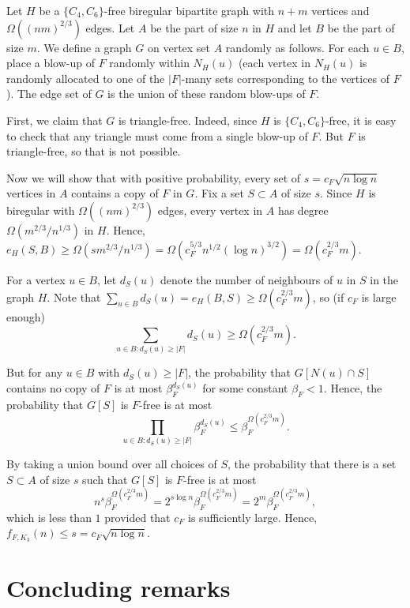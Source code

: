 \documentclass[11pt]{article}
\let\oldendproof\endproof
\renewenvironment{proof}[1][\proofname]{\oldproof[\bf #1]}{\oldendproof}
\theoremstyle{plain}
\theoremstyle{definition}
\begin{document}
\begin{proof}
	Let $H$ be a $\{C_4,C_6\}$-free biregular bipartite graph with $n+m$ vertices and $\Omega((nm)^{2/3})$ edges. Let $A$ be the part of size $n$ in $H$ and let $B$ be the part of size $m$. We define a graph $G$ on vertex set $A$ randomly as follows. For each $u\in B$, place a blow-up of $F$ randomly within $N_H(u)$ (each vertex in $N_H(u)$ is randomly allocated to one of the $|F|$-many sets corresponding to the vertices of $F$). The edge set of $G$ is the union of these random blow-ups of $F$.
	
	First, we claim that $G$ is triangle-free. Indeed, since $H$ is $\{C_4,C_6\}$-free, it is easy to check that any triangle must come from a single blow-up of $F$. But $F$ is triangle-free, so that is not possible.
	
	Now we will show that with positive probability, every set of $s=c_F\sqrt{n \log n}$ vertices in $A$ contains a copy of $F$ in $G$. Fix a set $S\subset A$ of size $s$. Since $H$ is biregular with $\Omega((nm)^{2/3})$ edges, every vertex in $A$ has degree $\Omega(m^{2/3}/n^{1/3})$ in $H$. Hence, $e_H(S,B)\geq \Omega(sm^{2/3}/n^{1/3})=\Omega(c_F^{5/3} n^{1/2} (\log n)^{3/2})=\Omega(c_F^{2/3} m)$.
	
	For a vertex $u\in B$, let $d_S(u)$ denote the number of neighbours of $u$ in $S$ in the graph $H$. Note that $\sum_{u\in B} d_S(u)=e_H(B,S)\geq \Omega(c_F^{2/3} m)$, so (if $c_F$ is large enough)
	$$\sum_{u\in B: d_S(u)\geq |F|} d_S(u)\geq \Omega(c_F^{2/3} m).$$
	
	But for any $u\in B$ with $d_S(u)\geq |F|$, the probability that $G[N(u)\cap S]$ contains no copy of $F$ is at most $\beta_F^{d_S(u)}$ for some constant $\beta_F<1$. Hence, the probability that $G[S]$ is $F$-free is at most $$\prod_{u\in B: d_S(u)\geq |F|} \beta_F^{d_S(u)}\leq \beta_F^{\Omega(c_F^{2/3} m)}.$$
	
	By taking a union bound over all choices of $S$, the probability that there is a set $S\subset A$ of size $s$ such that $G[S]$ is $F$-free is at most $$n^s\beta_F^{\Omega(c_F^{2/3} m)}= 2^{s \log n}\beta_F^{\Omega(c_F^{2/3} m)}=2^{m}\beta_F^{\Omega(c_F^{2/3} m)},$$
	which is less than $1$ provided that $c_F$ is sufficiently large. Hence, $f_{F,K_3}(n)\leq s=c_F \sqrt{n \log n}$.
\end{proof}

\section{Concluding remarks} \label{sec:concluding}
\end{document}
